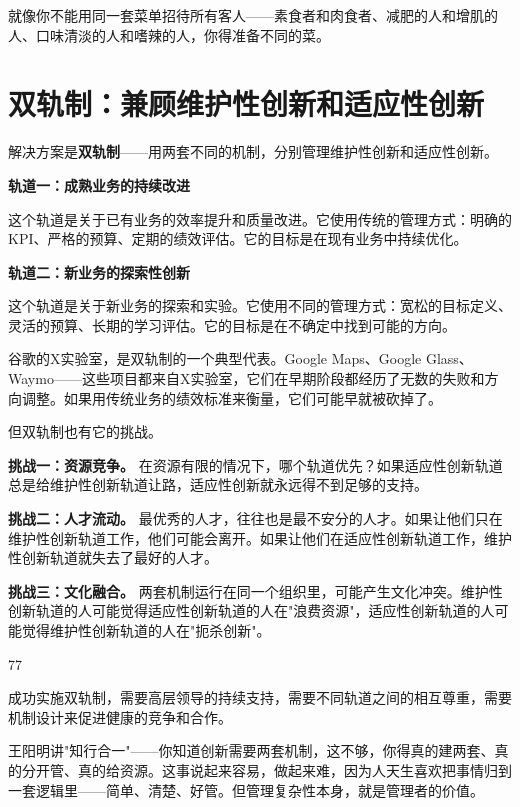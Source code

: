 就像你不能用同一套菜单招待所有客人——素食者和肉食者、减肥的人和增肌的人、口味清淡的人和嗜辣的人，你得准备不同的菜。

\section{双轨制：兼顾维护性创新和适应性创新}


解决方案是\textbf{双轨制}——用两套不同的机制，分别管理维护性创新和适应性创新。

\textbf{轨道一：成熟业务的持续改进}

这个轨道是关于已有业务的效率提升和质量改进。它使用传统的管理方式：明确的KPI、严格的预算、定期的绩效评估。它的目标是在现有业务中持续优化。

\textbf{轨道二：新业务的探索性创新}

这个轨道是关于新业务的探索和实验。它使用不同的管理方式：宽松的目标定义、灵活的预算、长期的学习评估。它的目标是在不确定中找到可能的方向。

谷歌的X实验室，是双轨制的一个典型代表。Google Maps、Google Glass、Waymo——这些项目都来自X实验室，它们在早期阶段都经历了无数的失败和方向调整。如果用传统业务的绩效标准来衡量，它们可能早就被砍掉了。

但双轨制也有它的挑战。

\textbf{挑战一：资源竞争。} 在资源有限的情况下，哪个轨道优先？如果适应性创新轨道总是给维护性创新轨道让路，适应性创新就永远得不到足够的支持。

\textbf{挑战二：人才流动。} 最优秀的人才，往往也是最不安分的人才。如果让他们只在维护性创新轨道工作，他们可能会离开。如果让他们在适应性创新轨道工作，维护性创新轨道就失去了最好的人才。

\textbf{挑战三：文化融合。} 两套机制运行在同一个组织里，可能产生文化冲突。维护性创新轨道的人可能觉得适应性创新轨道的人在"浪费资源"，适应性创新轨道的人可能觉得维护性创新轨道的人在"扼杀创新"。

77%

成功实施双轨制，需要高层领导的持续支持，需要不同轨道之间的相互尊重，需要机制设计来促进健康的竞争和合作。

王阳明讲"知行合一"——你知道创新需要两套机制，这不够，你得真的建两套、真的分开管、真的给资源。这事说起来容易，做起来难，因为人天生喜欢把事情归到一套逻辑里——简单、清楚、好管。但管理复杂性本身，就是管理者的价值。


